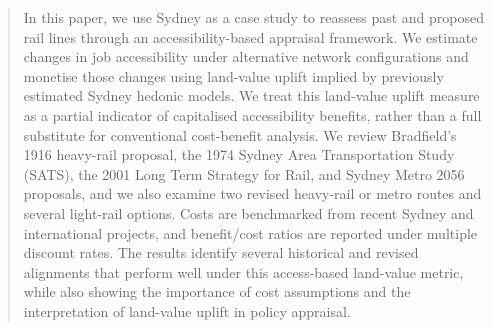 \documentclass[preprint,12pt,authoryear]{elsarticle}
\begin{document}
\begin{frontmatter}
\begin{abstract}
{In this paper, we use Sydney as a case study to reassess past and proposed rail lines through an accessibility-based appraisal framework. We estimate changes in job accessibility under alternative network configurations and monetise those changes using land-value uplift implied by previously estimated Sydney hedonic models. We treat this land-value uplift measure as a partial indicator of capitalised accessibility benefits, rather than a full substitute for conventional cost-benefit analysis. We review Bradfield's 1916 heavy-rail proposal, the 1974 Sydney Area Transportation Study (SATS), the 2001 Long Term Strategy for Rail, and Sydney Metro 2056 proposals, and we also examine two revised heavy-rail or metro routes and several light-rail options. Costs are benchmarked from recent Sydney and international projects, and benefit/cost ratios are reported under multiple discount rates. The results identify several historical and revised alignments that perform well under this access-based land-value metric, while also showing the importance of cost assumptions and the interpretation of land-value uplift in policy appraisal.}
\end{abstract}







\end{frontmatter}

\end{document}
